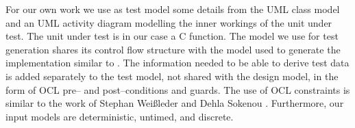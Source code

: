 For our own work we use as test model some details from the UML class model and an UML activity diagram modelling the inner workings of the unit under test. The unit under test is in our case a C function. The model we use for test generation shares its control flow structure with the model used to generate the implementation similar to \cite{Linzhang04GeneratingTestCasefromActivityGrayBoxMethod}. The information needed to be able to derive test data is added separately to the test model, not shared with the design model, in the form of OCL pre-- and post--conditions and guards. The use of OCL constraints is similar to the work of Stephan Wei{\ss}leder and Dehla Sokenou \cite{weissleder2008automatic}. Furthermore, our input models are deterministic, untimed, and discrete. %
